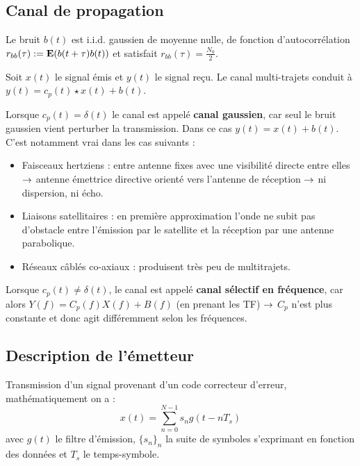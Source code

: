 \subsection{Canal de propagation}

	\begin{hyp}
		Le bruit $b(t)$ est i.i.d. gaussien de moyenne nulle, de fonction d'autocorrélation $r_{bb}(\tau) := \mathbf{E}(b(t + \tau) b(t))$ et satisfait $r_{bb}(\tau) = \frac{N_0}{2}$.
	\end{hyp}

	\begin{pop}
		Soit $x(t)$ le signal émis et $y(t)$ le signal reçu.
		Le canal multi-trajets conduit à $y(t) = c_p(t) \star x(t) + b(t)$.
	\end{pop}

	Lorsque $c_p(t) = \delta(t)$ le canal est appelé \textbf{canal gaussien}, car seul le bruit gaussien vient perturber la transmission.
	Dans ce cas $y(t) = x(t) + b(t)$.
	C'est notamment vrai dans les cas suivants :
	\begin{itemize}
	\item[\textbullet] Faisceaux hertziens : entre antenne fixes avec une visibilité directe entre elles $\rightarrow$ antenne émettrice directive orienté vers l'antenne de réception $\rightarrow$ ni dispersion, ni écho.
	\item[\textbullet] Liaisons satellitaires : en première approximation l'onde ne subit pas d'obstacle entre l'émission par le satellite et la réception par une antenne parabolique.
	\item[\textbullet] Réseaux câblés co-axiaux : produisent très peu de multitrajets.
	\end{itemize}

	Lorsque $c_p(t) \neq \delta(t)$, le canal est appelé \textbf{canal sélectif en fréquence}, car alors $Y(f) = C_p(f) X(f) + B(f)$ (en prenant les TF) $\rightarrow$ $C_p$ n'est plus constante et donc agit différemment selon les fréquences.


\subsection{Description de l'émetteur}

	\begin{defn}
	Transmission d'un signal provenant d'un code correcteur d'erreur, mathématiquement on a :
	$$x(t)=\sum_{n=0}^{N-1} s_{n}g(t-nT_{s})$$
	avec $g(t)$ le filtre d'émission, $\{s_{n}\}_{n}$ la suite de symboles s'exprimant en fonction des données et $T_{s}$ le temps-symbole.
	\end{defn}

